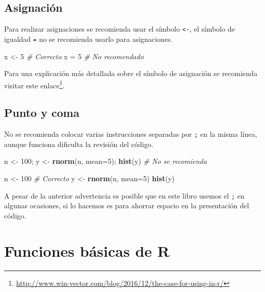 \documentclass[10pt,]{krantz}
\makeatletter
\newenvironment{Shaded}{\begin{snugshade}}{\end{snugshade}}
\newcommand{\KeywordTok}[1]{\textcolor[rgb]{0.13,0.29,0.53}{\textbf{#1}}}
\newcommand{\DataTypeTok}[1]{\textcolor[rgb]{0.13,0.29,0.53}{#1}}
\newcommand{\DecValTok}[1]{\textcolor[rgb]{0.00,0.00,0.81}{#1}}
\newcommand{\StringTok}[1]{\textcolor[rgb]{0.31,0.60,0.02}{#1}}
\newcommand{\CommentTok}[1]{\textcolor[rgb]{0.56,0.35,0.01}{\textit{#1}}}
\newcommand{\NormalTok}[1]{#1}
\let\proglang=\textsf
\renewcommand{\href}[2]{#2\footnote{\url{#1}}}
\newenvironment{kframe}{%
\medskip{}
\setlength{\fboxsep}{.8em}
 \def\at@end@of@kframe{}%
 \ifinner\ifhmode%
  \def\at@end@of@kframe{\end{minipage}}%
  \begin{minipage}{\columnwidth}%
 \fi\fi%
 \def\FrameCommand##1{\hskip\@totalleftmargin \hskip-\fboxsep
 \colorbox{shadecolor}{##1}\hskip-\fboxsep
     \hskip-\linewidth \hskip-\@totalleftmargin \hskip\columnwidth}%
 \MakeFramed {\advance\hsize-\width
   \@totalleftmargin\z@ \linewidth\hsize
   \@setminipage}}%
 {\par\unskip\endMakeFramed%
 \at@end@of@kframe}
\renewenvironment{Shaded}{\begin{kframe}}{\end{kframe}}
\makeatother
\begin{document}
\section{Asignación}\label{asignacion}

Para realizar asignaciones se recomienda usar el símbolo
\texttt{\textless{}-}, el símbolo de igualdad \texttt{=} no se
recomienda usarlo para asignaciones.

\begin{Shaded}
\begin{Highlighting}[]
\NormalTok{x <-}\StringTok{ }\DecValTok{5}  \CommentTok{# Correcto}
\NormalTok{x =}\StringTok{ }\DecValTok{5}   \CommentTok{# No recomendado}
\end{Highlighting}
\end{Shaded}

Para una explicación más detallada sobre el símbolo de asignación se
recomienda visitar este
\href{http://www.win-vector.com/blog/2016/12/the-case-for-using-in-r/}{enlace}.

\section{Punto y coma}\label{punto-y-coma}

No se recomienda colocar varias instrucciones separadas por \texttt{;}
en la misma línea, aunque funciona dificulta la revisión del código.

\begin{Shaded}
\begin{Highlighting}[]
\NormalTok{n <-}\StringTok{ }\DecValTok{100}\NormalTok{; y <-}\StringTok{ }\KeywordTok{rnorm}\NormalTok{(n, }\DataTypeTok{mean=}\DecValTok{5}\NormalTok{); }\KeywordTok{hist}\NormalTok{(y)  }\CommentTok{# No se recomienda}

\NormalTok{n <-}\StringTok{ }\DecValTok{100}                                  \CommentTok{# Correcto}
\NormalTok{y <-}\StringTok{ }\KeywordTok{rnorm}\NormalTok{(n, }\DataTypeTok{mean=}\DecValTok{5}\NormalTok{)}
\KeywordTok{hist}\NormalTok{(y)}
\end{Highlighting}
\end{Shaded}

A pesar de la anterior advertencia es posible que en este libro usemos
el \texttt{;} en algunas ocasiones, si lo hacemos es para ahorrar
espacio en la presentación del código.

\chapter{\texorpdfstring{Funciones básicas de \proglang{R}
\label{funbas}}{Funciones básicas de  }}\label{funciones-basicas-de}
\end{document}
